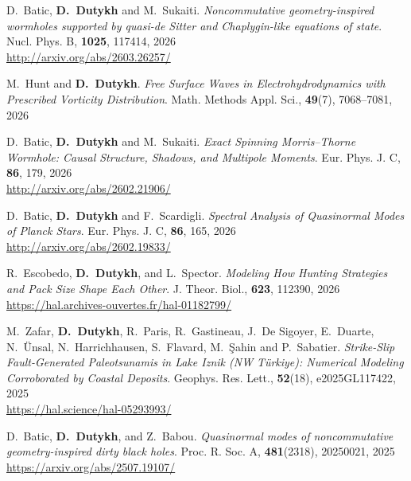 \begin{etaremune}
  \item D.~Batic, \textbf{D.~Dutykh} and M.~Sukaiti. \textit{Noncommutative geometry-inspired wormholes supported by quasi-de Sitter and Chaplygin-like equations of state}. Nucl. Phys. B, \textbf{1025}, 117414, 2026 \\ %
  \url{http://arxiv.org/abs/2603.26257/}

  \item M.~Hunt and \textbf{D.~Dutykh}. \textit{Free Surface Waves in Electrohydrodynamics with Prescribed Vorticity Distribution}. Math. Methods Appl. Sci., \textbf{49}(7), 7068--7081, 2026 %

  \item D.~Batic, \textbf{D.~Dutykh} and M.~Sukaiti. \textit{Exact Spinning Morris--Thorne Wormhole: Causal Structure, Shadows, and Multipole Moments}. Eur. Phys. J. C, \textbf{86}, 179, 2026 \\ %
  \url{http://arxiv.org/abs/2602.21906/}

  \item D.~Batic, \textbf{D.~Dutykh} and F.~Scardigli. \textit{Spectral Analysis of Quasinormal Modes of Planck Stars}. Eur. Phys. J. C, \textbf{86}, 165, 2026 \\ %
  \url{http://arxiv.org/abs/2602.19833/}

  \item R.~Escobedo, \textbf{D.~Dutykh}, and L.~Spector. \textit{Modeling How Hunting Strategies and Pack Size Shape Each Other}. J. Theor. Biol., \textbf{623}, 112390, 2026 \\ %
  \url{https://hal.archives-ouvertes.fr/hal-01182799/}

  
  
  \item M.~Zafar, \textbf{D.~Dutykh}, R.~Paris, R.~Gastineau, J.~De Sigoyer, E.~Duarte, N.~\"Unsal, N.~Harrichhausen, S.~Flavard, M.~\c{S}ahin and P.~Sabatier. \textit{Strike-Slip Fault-Generated Paleotsunamis in Lake Iznik (NW T\"{u}rkiye): Numerical Modeling Corroborated by Coastal Deposits}. Geophys. Res. Lett., \textbf{52}(18), e2025GL117422, 2025 \\ %
  \url{https://hal.science/hal-05293993/}

  \item D.~Batic, \textbf{D.~Dutykh}, and Z.~Babou. \textit{Quasinormal modes of noncommutative geometry-inspired dirty black holes}. Proc. R. Soc. A, \textbf{481}(2318), 20250021, 2025 \\ %
  \url{https://arxiv.org/abs/2507.19107/}


\end{etaremune}
